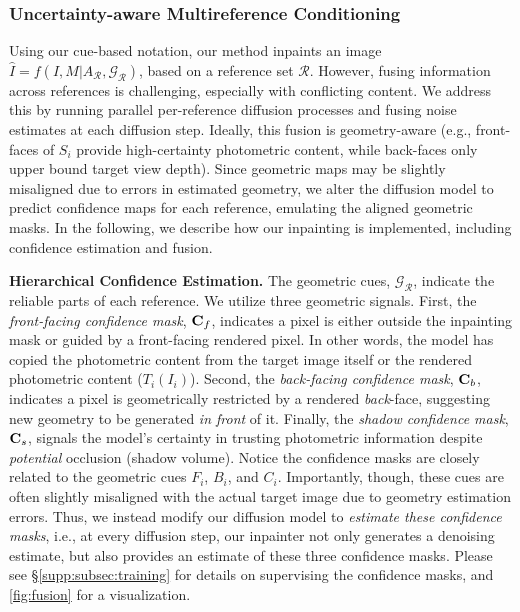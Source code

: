 \subsubsection{Uncertainty-aware Multireference Conditioning}
\label{subsec:mrcond}

Using our cue-based notation, our method inpaints
an image
$ \widehat{I} = f(I,M|A_\mathcal{R}, \mathcal{G}_\mathcal{R}) $, based on a reference set $\mathcal{R}$.
However, fusing information across references is
challenging,
especially
with
conflicting
content.
We address this by running parallel per-reference diffusion processes and fusing
noise estimates at each diffusion step.
Ideally, this fusion is geometry-aware
(e.g., front-faces of $S_i$ provide
high-certainty
photometric content,
while back-faces only upper bound target view depth).
Since geometric maps
may be slightly misaligned
due to errors in estimated geometry, we alter the diffusion model to predict confidence maps for each reference, 
emulating the aligned geometric masks.
In the following, we describe how our inpainting is implemented, including confidence estimation and 
fusion.


\noindent\textbf{Hierarchical Confidence Estimation.}
The geometric cues, $\mathcal{G}_\mathcal{R}$, 
indicate
the reliable parts of each reference.
We
utilize three geometric signals.
First, the \textit{front-facing confidence mask}, $\mathbf{C}_f$, indicates a pixel is either outside the inpainting mask 
or guided by a front-facing rendered pixel. In other words, the model has copied the photometric content from the target image itself or the rendered photometric content ($T_i(I_i)$). 
Second, the \textit{back-facing confidence mask}, $\mathbf{C}_b$, indicates a pixel is geometrically
restricted
by a rendered \textit{back}-face, 
suggesting
new geometry
to
be generated \textit{in front} of it.
Finally, the \textit{shadow confidence mask}, $\mathbf{C}_s$, signals the model’s certainty in trusting photometric information despite \textit{potential} occlusion (shadow volume).
Notice the confidence masks are closely related to the geometric cues $F_i$, $B_i$, and $C_i$.
Importantly, though, 
these cues
are often slightly misaligned with the actual target image due to geometry estimation errors. 
Thus, we instead modify our diffusion model to \textit{estimate these
confidence masks},
i.e., at every diffusion step, our inpainter not only generates a denoising estimate, but also provides an estimate of these three confidence masks. Please see \S\ref{supp:subsec:training} for details on supervising the confidence masks, and \cref{fig:fusion} for a visualization.

